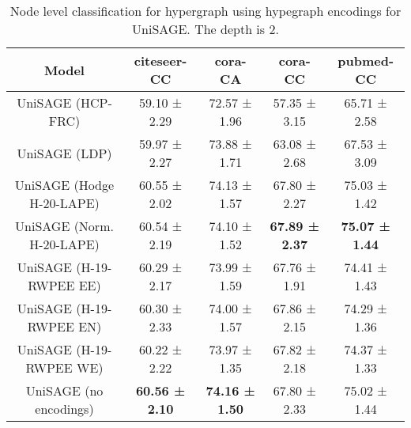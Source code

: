 \begin{table}[H]
\footnotesize
\centering
\begin{tabular}{|c|c|c|c|c|}
\hline
Model & citeseer-CC & cora-CA & cora-CC & pubmed-CC \\
\hline
UniSAGE (HCP-FRC) & 59.10 ± 2.29 & 72.57 ± 1.96 & 57.35 ± 3.15 & 65.71 ± 2.58 \\
UniSAGE (LDP) & 59.97 ± 2.27 & 73.88 ± 1.71 & 63.08 ± 2.68 & 67.53 ± 3.09 \\
UniSAGE (Hodge H-20-LAPE) & 60.55 ± 2.02 & 74.13 ± 1.57 & 67.80 ± 2.27 & 75.03 ± 1.42 \\
UniSAGE (Norm. H-20-LAPE) & 60.54 ± 2.19 & 74.10 ± 1.52 & \textbf{67.89 ± 2.37} & \textbf{75.07 ± 1.44} \\
UniSAGE (H-19-RWPEE EE) & 60.29 ± 2.17 & 73.99 ± 1.59 & 67.76 ± 1.91 & 74.41 ± 1.43 \\
UniSAGE (H-19-RWPEE EN) & 60.30 ± 2.33 & 74.00 ± 1.57 & 67.86 ± 2.15 & 74.29 ± 1.36 \\
UniSAGE (H-19-RWPEE WE) & 60.22 ± 2.22 & 73.97 ± 1.35 & 67.82 ± 2.18 & 74.37 ± 1.33 \\
\hline
UniSAGE (no encodings) & \textbf{60.56 ± 2.10} & \textbf{74.16 ± 1.50} & 67.80 ± 2.33 & 75.02 ± 1.44 \\
\hline
\end{tabular}
\caption{Node level classification for hypergraph using hypegraph encodings for UniSAGE. The depth is 2.}
\label{tab:hg_node_classification_UniSAGE}
\end{table}



